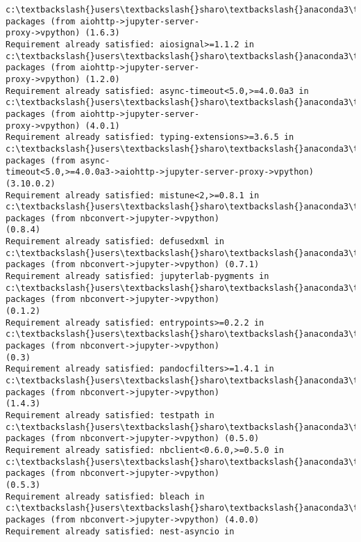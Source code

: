 \documentclass[11pt]{article}
\begin{document}
\begin{Verbatim}[commandchars=\\\{\}]
c:\textbackslash{}users\textbackslash{}sharo\textbackslash{}anaconda3\textbackslash{}lib\textbackslash{}site-packages (from aiohttp->jupyter-server-
proxy->vpython) (1.6.3)
Requirement already satisfied: aiosignal>=1.1.2 in
c:\textbackslash{}users\textbackslash{}sharo\textbackslash{}anaconda3\textbackslash{}lib\textbackslash{}site-packages (from aiohttp->jupyter-server-
proxy->vpython) (1.2.0)
Requirement already satisfied: async-timeout<5.0,>=4.0.0a3 in
c:\textbackslash{}users\textbackslash{}sharo\textbackslash{}anaconda3\textbackslash{}lib\textbackslash{}site-packages (from aiohttp->jupyter-server-
proxy->vpython) (4.0.1)
Requirement already satisfied: typing-extensions>=3.6.5 in
c:\textbackslash{}users\textbackslash{}sharo\textbackslash{}anaconda3\textbackslash{}lib\textbackslash{}site-packages (from async-
timeout<5.0,>=4.0.0a3->aiohttp->jupyter-server-proxy->vpython) (3.10.0.2)
Requirement already satisfied: mistune<2,>=0.8.1 in
c:\textbackslash{}users\textbackslash{}sharo\textbackslash{}anaconda3\textbackslash{}lib\textbackslash{}site-packages (from nbconvert->jupyter->vpython)
(0.8.4)
Requirement already satisfied: defusedxml in c:\textbackslash{}users\textbackslash{}sharo\textbackslash{}anaconda3\textbackslash{}lib\textbackslash{}site-
packages (from nbconvert->jupyter->vpython) (0.7.1)
Requirement already satisfied: jupyterlab-pygments in
c:\textbackslash{}users\textbackslash{}sharo\textbackslash{}anaconda3\textbackslash{}lib\textbackslash{}site-packages (from nbconvert->jupyter->vpython)
(0.1.2)
Requirement already satisfied: entrypoints>=0.2.2 in
c:\textbackslash{}users\textbackslash{}sharo\textbackslash{}anaconda3\textbackslash{}lib\textbackslash{}site-packages (from nbconvert->jupyter->vpython)
(0.3)
Requirement already satisfied: pandocfilters>=1.4.1 in
c:\textbackslash{}users\textbackslash{}sharo\textbackslash{}anaconda3\textbackslash{}lib\textbackslash{}site-packages (from nbconvert->jupyter->vpython)
(1.4.3)
Requirement already satisfied: testpath in c:\textbackslash{}users\textbackslash{}sharo\textbackslash{}anaconda3\textbackslash{}lib\textbackslash{}site-
packages (from nbconvert->jupyter->vpython) (0.5.0)
Requirement already satisfied: nbclient<0.6.0,>=0.5.0 in
c:\textbackslash{}users\textbackslash{}sharo\textbackslash{}anaconda3\textbackslash{}lib\textbackslash{}site-packages (from nbconvert->jupyter->vpython)
(0.5.3)
Requirement already satisfied: bleach in c:\textbackslash{}users\textbackslash{}sharo\textbackslash{}anaconda3\textbackslash{}lib\textbackslash{}site-
packages (from nbconvert->jupyter->vpython) (4.0.0)
Requirement already satisfied: nest-asyncio in

\end{Verbatim}
\end{document}

